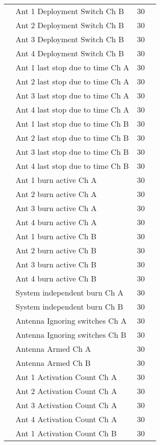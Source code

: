 \begin{longtable}{c|m{5cm}|M{1.5cm}|c}
    & Ant 1 Deployment Switch Ch B & 30 \\
    & Ant 2 Deployment Switch Ch B & 30 \\
    & Ant 3 Deployment Switch Ch B & 30 \\
    & Ant 4 Deployment Switch Ch B & 30 \\
    & Ant 1 last stop due to time Ch A & 30 \\
    & Ant 2 last stop due to time Ch A & 30 \\
    & Ant 3 last stop due to time Ch A & 30 \\
    & Ant 4 last stop due to time Ch A & 30 \\
    & Ant 1 last stop due to time Ch B & 30 \\
    & Ant 2 last stop due to time Ch B & 30 \\
    & Ant 3 last stop due to time Ch B & 30 \\
    & Ant 4 last stop due to time Ch B & 30 \\
    & Ant 1 burn active Ch A & 30 \\
    & Ant 2 burn active Ch A & 30 \\
    & Ant 3 burn active Ch A & 30 \\
    & Ant 4 burn active Ch A & 30 \\
    & Ant 1 burn active Ch B & 30 \\
    & Ant 2 burn active Ch B & 30 \\
    & Ant 3 burn active Ch B & 30 \\
    & Ant 4 burn active Ch B & 30 \\ 
    & System independent burn Ch A & 30 \\
    & System independent burn Ch B & 30 \\
    & Antenna Ignoring switches Ch A & 30 \\
    & Antenna Ignoring switches Ch B & 30 \\
    & Antenna Armed Ch A & 30 \\
    & Antenna Armed Ch B & 30 \\
    & Ant 1 Activation Count Ch A & 30 \\
    & Ant 2 Activation Count Ch A & 30 \\
    & Ant 3 Activation Count Ch A & 30 \\
    & Ant 4 Activation Count Ch A & 30 \\
    & Ant 1 Activation Count Ch B & 30 \\

\end{longtable}
